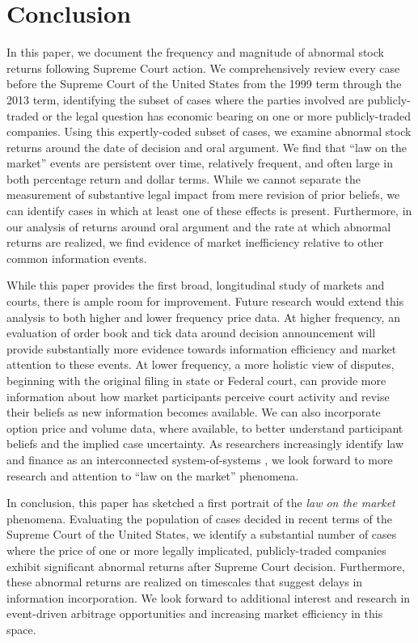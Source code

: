 \documentclass[preprint,12pt]{elsarticle}
\begin{document}
\section{Conclusion}
\label{S:6}
In this paper, we document the frequency and magnitude of abnormal stock returns following Supreme Court action.  We comprehensively review every case before the Supreme Court of the United States from the 1999 term through the 2013 term, identifying the subset of cases where the parties involved are publicly-traded or the legal question has economic bearing on one or more publicly-traded companies.  Using this expertly-coded subset of cases, we examine abnormal stock returns around the date of decision and oral argument.  We find that ``law on the market'' events are persistent over time, relatively frequent, and often large in both percentage return and dollar terms.  While we cannot separate the measurement of substantive legal impact from mere revision of prior beliefs, we can identify cases in which at least one of these effects is present.  Furthermore, in our analysis of returns around oral argument and the rate at which abnormal returns are realized, we find evidence of market inefficiency relative to other common information events.

While this paper provides the first broad, longitudinal study of markets and courts, there is ample room for improvement.  Future research would extend this analysis to both higher and lower frequency price data.  At higher frequency, an evaluation of order book and tick data around decision announcement will provide substantially more evidence towards information efficiency and market attention to these events.  At lower frequency, a more holistic view of disputes, beginning with the original filing in state or Federal court, can provide more information about how market participants perceive court activity and revise their beliefs as new information becomes available.  We can also incorporate option price and volume data, where available, to better understand participant beliefs and the implied case uncertainty.  As researchers increasingly identify law and finance as an interconnected system-of-systems \cite{ruhl2017harnessing}, we look forward to more research and attention to ``law on the market'' phenomena.

In conclusion, this paper has sketched a first portrait of the \textit{law on the market} phenomena. Evaluating the population of cases decided in recent terms of the Supreme Court of the United States, we identify a substantial number of cases where the price of one or more legally implicated, publicly-traded companies exhibit significant abnormal returns after Supreme Court decision.  Furthermore, these abnormal returns are realized on timescales that suggest delays in information incorporation.  We look forward to additional interest and research in event-driven arbitrage opportunities and increasing market efficiency in this space.
\\
\end{document}
